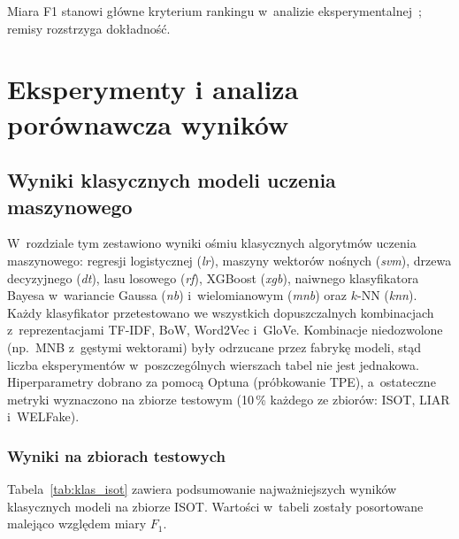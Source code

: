 \documentclass[oneside,polski,logo]{amuthesis}
\begin{document}
Miara F1 stanowi główne kryterium rankingu w~analizie eksperymentalnej~\cite{zhou2020survey, Hu2025}; remisy rozstrzyga dokładność.


\chapter{Eksperymenty i analiza porównawcza wyników}

\section{Wyniki klasycznych modeli uczenia maszynowego}
\label{sec:wyniki_klasyczne}

W~rozdziale tym zestawiono wyniki ośmiu klasycznych algorytmów uczenia
maszynowego: regresji logistycznej (\textit{lr}), maszyny wektorów
nośnych (\textit{svm}), drzewa decyzyjnego (\textit{dt}), lasu
losowego (\textit{rf}), XGBoost (\textit{xgb}), naiwnego klasyfikatora
Bayesa w~wariancie Gaussa (\textit{nb}) i~wielomianowym (\textit{mnb})
oraz $k$-NN (\textit{knn}). Każdy klasyfikator przetestowano we wszystkich
dopuszczalnych kombinacjach z~reprezentacjami TF-IDF, BoW, Word2Vec i~GloVe.
Kombinacje niedozwolone (np.\ MNB z~gęstymi wektorami) były odrzucane
przez fabrykę modeli, stąd liczba eksperymentów w~poszczególnych wierszach
tabel nie jest jednakowa. Hiperparametry dobrano za pomocą Optuna
(próbkowanie TPE), a~ostateczne metryki wyznaczono na zbiorze testowym
(10\,\% każdego ze zbiorów: ISOT, LIAR i~WELFake).

\subsection{Wyniki na zbiorach testowych}
\label{sec:wyniki_klasyczne_test}

Tabela~\ref{tab:klas_isot} zawiera podsumowanie najważniejszych
wyników klasycznych modeli na zbiorze ISOT. Wartości w~tabeli zostały
posortowane malejąco względem miary $F_1$.
\end{document}
